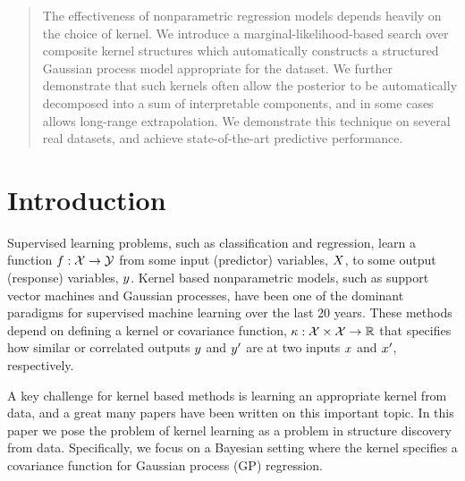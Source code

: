 \documentclass[twoside]{article}
\begin{document}

\begin{abstract}
The effectiveness of nonparametric regression models depends heavily on the choice of kernel.
We introduce a marginal-likelihood-based search over composite kernel structures which automatically constructs a structured Gaussian process model appropriate for the dataset.
We further demonstrate that such kernels often allow the posterior to be automatically decomposed into a sum of interpretable components, and in some cases allows long-range extrapolation.
We demonstrate this technique on several real datasets, and achieve state-of-the-art predictive performance.
\end{abstract}

\section{Introduction}

Supervised learning problems, such as classification and regression, learn a function ${f : \mathcal{X} \to \mathcal{Y}}$ from some input (predictor) variables, $X$, to some output (response) variables, $y$.
Kernel based nonparametric models, such as support vector machines and Gaussian processes, have been one of the dominant paradigms for supervised machine learning over the last 20 years.
These methods depend on defining a kernel or covariance function, $\kappa : \mathcal{X} \times \mathcal{X} \to \mathbb{R}$ that specifies how similar or correlated outputs $y$ and $y'$ are at two inputs $x$ and $x'$, respectively.

A key challenge for kernel based methods is learning an appropriate kernel from data, and a great many papers have been written on this important topic.
In this paper we pose the problem of kernel learning as a problem in structure discovery from data.
Specifically, we focus on a Bayesian setting where the kernel specifies a covariance function for Gaussian process (GP) regression.
\end{document}
